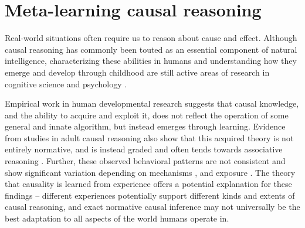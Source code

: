 \section{Meta-learning causal reasoning}

Real-world situations often require us to reason about cause and effect. Although causal reasoning has commonly been touted as an essential component of natural intelligence, characterizing these abilities in humans and understanding how they emerge and develop through childhood are still active areas of research in cognitive science and psychology \citep{waldmann2013causal, cartwright2004causation}. 

Empirical work in human developmental research suggests that causal knowledge, and the ability to acquire and exploit it, does not reflect the operation of some general and innate algorithm, but instead emerges through learning\citep{saxe2006perception, meltzoff2007infants, bonawitz2010just, carey2009origin}. Evidence from studies in adult causal reasoning also show that this acquired theory is not entirely normative, and is instead graded and often tends towards associative reasoning \citep{rehder2014independence, rehder2017failures, fernbach2010neglect, fernbach2013cognitive}. Further, these observed behavioral patterns are not consistent and show significant variation depending on mechanisms \citep{lombrozo2010causal}, and exposure \citep{krynski2007role}. The theory that causality is learned from experience offers a potential explanation for these findings -- different experiences potentially support different kinds and extents of causal reasoning, and exact normative causal inference may not universally be the best adaptation to all aspects of the world humans operate in.


